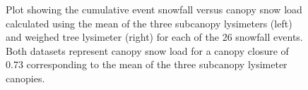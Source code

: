 \documentclass[
  letterpaper,
  DIV=11,
  numbers=noendperiod]{scrartcl}
\begin{document}
\begin{figure}[H]


\caption{\label{fig-scl-w-sf}Plot showing the cumulative event snowfall
versus canopy snow load calculated using the mean of the three subcanopy
lysimeters (left) and weighed tree lysimeter (right) for each of the 26
snowfall events. Both datasets represent canopy snow load for a canopy
closure of 0.73 corresponding to the mean of the three subcanopy
lysimeter canopies.}

\end{figure}%

\pagebreak
{}
\end{document}
